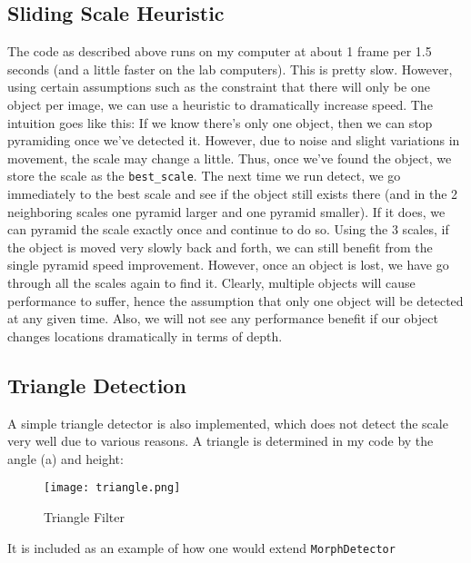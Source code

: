 \documentclass[11pt]{article}
\begin{document}
\subsection{Sliding Scale Heuristic}
The code as described above runs on my computer at about 1 frame per 1.5 seconds (and a little faster on the lab computers).  This is pretty slow.  However, using certain assumptions such as the constraint that there will only be one object per image, we can use a heuristic to dramatically increase speed.  The intuition goes like this:  If we know there's only one object, then we can stop pyramiding once we've detected it.  However, due to noise and slight variations in movement, the scale may change a little.  Thus, once we've found the object, we store the scale as the \texttt{best\_scale}.  The next time we run detect, we go immediately to the best scale and see if the object still exists there (and in the 2 neighboring scales one pyramid larger and one pyramid smaller). If it does, we can pyramid the scale exactly once and continue to do so.  Using the 3 scales, if the object is moved very slowly back and forth, we can still benefit from the single pyramid speed improvement.  However, once an object is lost, we have go through all the scales again to find it.  Clearly, multiple objects will cause performance to suffer, hence the assumption that only one object will be detected at any given time.  Also, we will not see any performance benefit if our object changes locations dramatically in terms of depth.

\subsection{Triangle Detection}
A simple triangle detector is also implemented, which does not detect the scale very well due to various reasons.  A triangle is determined in my code by the angle (a) and height:

\begin{figure}[h]
\caption{Triangle Filter}
\texttt{[image: triangle.png]}
\end{figure}

It is included as an example of how one would extend \texttt{MorphDetector}
\end{document}
